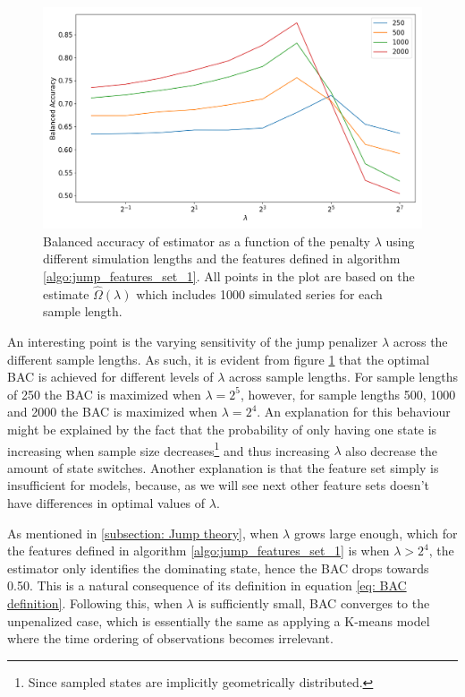 \begin{figure}[H] 
    \centering
    \includegraphics[width=1\textwidth]{analysis/model_convergence/images/jump_penalties_feature_set_1.png}
    \caption[Balanced accuracy of \jump estimator using feature set 1]{Balanced accuracy of \jump estimator as a function of the penalty $\lambda$ using different simulation lengths and the features defined in algorithm \ref{algo:jump_features_set_1}. All points in the plot are based on the estimate $\hat{\Omega} (\lambda)$ which includes 1000 simulated series for each sample length.}
    \label{fig: BAC plot feature set 1}
\end{figure}

An interesting point is the varying sensitivity of the jump penalizer $\lambda$ across the different sample lengths. As such, it is evident from figure \ref{fig: BAC plot feature set 1} that the optimal BAC is achieved for different levels of $\lambda$ across sample lengths. For sample lengths of 250 the BAC is maximized when $\lambda = 2^5$, however, for sample lengths 500, 1000 and 2000 the BAC is maximized when $\lambda = 2^4$. An explanation for this behaviour might be explained by the fact that the probability of only having one state is increasing when sample size decreases\footnote
{Since sampled states are implicitly geometrically distributed.
}
and thus increasing $\lambda$ also decrease the amount of state switches. Another explanation is that the feature set simply is insufficient for \jump models, because, as we will see next other feature sets doesn't have differences in optimal values of $\lambda$.

As mentioned in \cref{subsection: Jump theory}, when $\lambda$ grows large enough, which for the features defined in algorithm \ref{algo:jump_features_set_1} is when $\lambda > 2^4$, the \jump estimator only identifies the dominating state, hence the BAC drops towards 0.50. This is a natural consequence of its definition in equation \ref{eq: BAC definition}. Following this, when $\lambda$ is sufficiently small, BAC converges to the unpenalized case, which is essentially the same as applying a K-means model where the time ordering of observations becomes irrelevant. 

